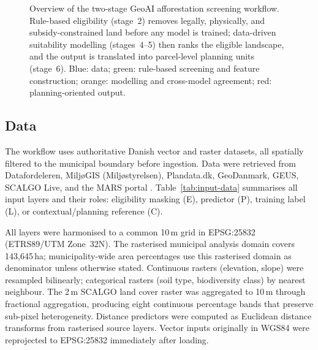 \documentclass[land,article,submit,moreauthors]{Definitions/mdpi}
\begin{document}
\begin{figure}[H]
\caption{Overview of the two-stage GeoAI afforestation screening workflow. Rule-based
eligibility (stage~2) removes legally, physically, and subsidy-constrained land before
any model is trained; data-driven suitability modelling (stages~4--5) then ranks the
eligible landscape, and the output is translated into parcel-level planning units
(stage~6). Blue: data; green: rule-based screening and feature construction; orange:
modelling and cross-model agreement; red: planning-oriented output.}
\label{fig:workflow}
\end{figure}
\subsection{Data}
\label{sec:data}

The workflow uses authoritative Danish vector and raster datasets, all spatially filtered to the municipal boundary before ingestion. Data were retrieved from Datafordeleren, Milj{\o}GIS (Milj{\o}styrelsen), Plandata.dk, GeoDanmark, GEUS, SCALGO Live, and the MARS portal \citep{marsvejledning}. Table~\ref{tab:input-data} summarises all input layers and their roles: eligibility masking (E), predictor (P), training label (L), or contextual/planning reference (C).

All layers were harmonised to a common 10\,m grid in EPSG:25832 (ETRS89/UTM Zone~32N). The rasterised municipal analysis domain covers 143{,}645\,ha; municipality-wide area percentages use this rasterised domain as denominator unless otherwise stated. Continuous rasters (elevation, slope) were resampled bilinearly; categorical rasters (soil type, biodiversity class) by nearest neighbour. The 2\,m SCALGO land cover raster was aggregated to 10\,m through fractional aggregation, producing eight continuous percentage bands that preserve sub-pixel heterogeneity. Distance predictors were computed as Euclidean distance transforms from rasterised source layers. Vector inputs originally in WGS84 were reprojected to EPSG:25832 immediately after loading.
\end{document}
